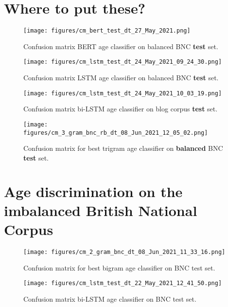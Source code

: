 \section{Where to put these?}

\begin{figure}[H]
    \centering
    \texttt{[image: figures/cm\_bert\_test\_dt\_27\_May\_2021.png]}
    \caption{Confusion matrix BERT age classifier on balanced BNC \textbf{test} set.}
    \label{fig:cm_bert_bnc_rb}
\end{figure}

\begin{figure}[H]
    \centering
    \texttt{[image: figures/cm\_lstm\_test\_dt\_24\_May\_2021\_09\_24\_30.png]}
    \caption{Confusion matrix LSTM age classifier on balanced BNC \textbf{test} set.}
    \label{fig:cm_lstm_bnc_rb}
\end{figure}

\begin{figure}[H]
    \centering
    \texttt{[image: figures/cm\_lstm\_test\_dt\_24\_May\_2021\_10\_03\_19.png]}
    \caption{Confusion matrix bi-LSTM age classifier on blog corpus \textbf{test} set.}
    \label{fig:cm_lstm_blog}
\end{figure}

\begin{figure}[H]
    \centering
    \texttt{[image: figures/cm\_3\_gram\_bnc\_rb\_dt\_08\_Jun\_2021\_12\_05\_02.png]}
    \caption{Confusion matrix for best trigram age classifier on \textbf{balanced} BNC \textbf{test} set.}
    \label{fig:cm_trigram_bnc_rb}
\end{figure}

\section{Age discrimination on the imbalanced British National Corpus}
\label{age_disc_bnc}

\begin{figure}[H]
    \centering
    \texttt{[image: figures/cm\_2\_gram\_bnc\_dt\_08\_Jun\_2021\_11\_33\_16.png]}
    \caption{Confusion matrix for best bigram age classifier on BNC test set.}
    \label{fig:cm_bigram_bnc}
\end{figure}

\begin{figure}[H]
    \centering
    \texttt{[image: figures/cm\_lstm\_test\_dt\_22\_May\_2021\_12\_41\_50.png]}
    \caption{Confusion matrix bi-LSTM age classifier on BNC test set.}
    \label{fig:cm_lstm_bnc}
\end{figure}

